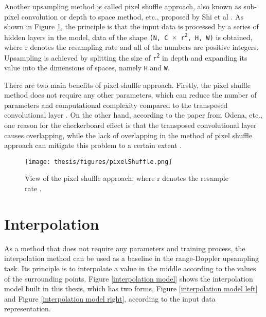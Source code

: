 Another upsampling method is called pixel shuffle approach, also known as sub-pixel convolution or depth to space method, etc., proposed by Shi et al \cite{shi_real-time_2016}. As shown in Figure \ref{view of the pixel shuffle}, the principle is that the input data is processed by a series of hidden layers in the model, data of the shape \texttt{(N, C $\times$ r\textsuperscript{2}, H, W)} is obtained, where r denotes the resampling rate and all of the numbers are positive integers. Upsampling is achieved by splitting the size of \texttt{r\textsuperscript{2}} in depth and expanding its value into the dimensions of spaces, namely \texttt{H} and \texttt{W}.

There are two main benefits of pixel shuffle approach. Firstly, the pixel shuffle method does not require any other parameters, which can reduce the number of parameters and computational complexity compared to the transposed convolutional layer \cite{shi_is_nodate}. On the other hand, according to the paper from Odena, etc., one reason for the checkerboard effect is that the transposed convolutional layer causes overlapping, while the lack of overlapping in the method of pixel shuffle approach can mitigate this problem to a certain extent \cite{odena_deconvolution_2016}.

\begin{figure}
	\centering
	\texttt{[image: thesis/figures/pixelShuffle.png]}
	\caption{View of the pixel shuffle approach, where r denotes the resample rate \cite{shi_real-time_2016}.}
	\label{view of the pixel shuffle}
\end{figure}

\section{Interpolation} \label{interpolation}
As a method that does not require any parameters and training process, the interpolation method can be used as a baseline in the range-Doppler upsampling task. Its principle is to interpolate a value in the middle according to the values of the surrounding points. Figure \ref{interpolation model} shows the interpolation model built in this thesis, which has two forms, Figure \ref{interpolation model left} and Figure \ref{interpolation model right}, according to the input data representation.

